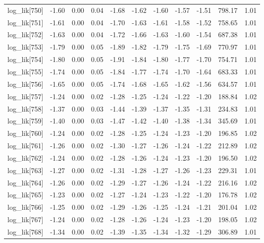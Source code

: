 \begin{table}[ht]
\begin{tabular}{rrrrrrrrrrr}
  log\_lik[750] & -1.60 & 0.00 & 0.04 & -1.68 & -1.62 & -1.60 & -1.57 & -1.51 & 798.17 & 1.01 \\ 
  log\_lik[751] & -1.61 & 0.00 & 0.04 & -1.70 & -1.63 & -1.61 & -1.58 & -1.52 & 758.65 & 1.01 \\ 
  log\_lik[752] & -1.63 & 0.00 & 0.04 & -1.72 & -1.66 & -1.63 & -1.60 & -1.54 & 687.38 & 1.01 \\ 
  log\_lik[753] & -1.79 & 0.00 & 0.05 & -1.89 & -1.82 & -1.79 & -1.75 & -1.69 & 770.97 & 1.01 \\ 
  log\_lik[754] & -1.80 & 0.00 & 0.05 & -1.91 & -1.84 & -1.80 & -1.77 & -1.70 & 754.71 & 1.01 \\ 
  log\_lik[755] & -1.74 & 0.00 & 0.05 & -1.84 & -1.77 & -1.74 & -1.70 & -1.64 & 683.33 & 1.01 \\ 
  log\_lik[756] & -1.65 & 0.00 & 0.05 & -1.74 & -1.68 & -1.65 & -1.62 & -1.56 & 634.57 & 1.01 \\ 
  log\_lik[757] & -1.24 & 0.00 & 0.02 & -1.28 & -1.25 & -1.24 & -1.22 & -1.20 & 188.84 & 1.02 \\ 
  log\_lik[758] & -1.37 & 0.00 & 0.03 & -1.44 & -1.39 & -1.37 & -1.35 & -1.31 & 234.83 & 1.01 \\ 
  log\_lik[759] & -1.40 & 0.00 & 0.03 & -1.47 & -1.42 & -1.40 & -1.38 & -1.34 & 345.69 & 1.01 \\ 
  log\_lik[760] & -1.24 & 0.00 & 0.02 & -1.28 & -1.25 & -1.24 & -1.23 & -1.20 & 196.85 & 1.02 \\ 
  log\_lik[761] & -1.26 & 0.00 & 0.02 & -1.30 & -1.27 & -1.26 & -1.24 & -1.22 & 212.89 & 1.02 \\ 
  log\_lik[762] & -1.24 & 0.00 & 0.02 & -1.28 & -1.26 & -1.24 & -1.23 & -1.20 & 196.50 & 1.02 \\ 
  log\_lik[763] & -1.27 & 0.00 & 0.02 & -1.31 & -1.28 & -1.27 & -1.26 & -1.23 & 229.31 & 1.01 \\ 
  log\_lik[764] & -1.26 & 0.00 & 0.02 & -1.29 & -1.27 & -1.26 & -1.24 & -1.22 & 216.16 & 1.02 \\ 
  log\_lik[765] & -1.23 & 0.00 & 0.02 & -1.27 & -1.24 & -1.23 & -1.22 & -1.20 & 176.78 & 1.02 \\ 
  log\_lik[766] & -1.25 & 0.00 & 0.02 & -1.29 & -1.26 & -1.25 & -1.24 & -1.21 & 201.04 & 1.02 \\ 
  log\_lik[767] & -1.24 & 0.00 & 0.02 & -1.28 & -1.26 & -1.24 & -1.23 & -1.20 & 198.05 & 1.02 \\ 
  log\_lik[768] & -1.34 & 0.00 & 0.02 & -1.39 & -1.35 & -1.34 & -1.32 & -1.29 & 306.89 & 1.01 \\ 

\end{tabular}
\end{table}
